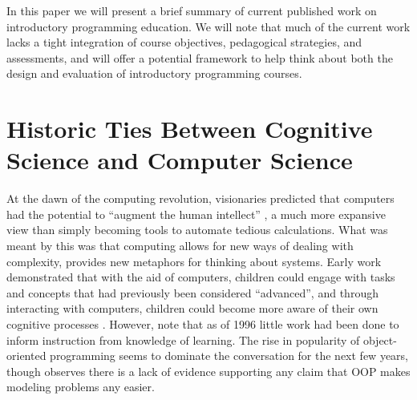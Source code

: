 \documentclass[12pt]{article}
\let\textcite=\autocite
\begin{document}
In this paper we will present a brief summary of current published
work on introductory programming education. We will note that much of
the current work lacks a tight integration of course objectives,
pedagogical strategies, and assessments, and will offer a potential
framework to help think about both the design and evaluation of
introductory programming courses.


\section{Historic Ties Between Cognitive Science and Computer Science}
At the dawn of the computing revolution, visionaries predicted that
computers had the potential to “augment the human intellect”
\autocite{engelbart_augmenting_1962}, a much more expansive view than
simply becoming tools to automate tedious calculations. What was meant
by this was that computing allows for new ways of dealing with
complexity, provides new metaphors for thinking about
systems\autocite{kay_history_1996}. Early work demonstrated that with
the aid of computers, children could engage with tasks and concepts
that had previously been considered “advanced”, and through
interacting with computers, children could become more aware of their
own cognitive processes \autocite{papert_mindstorms_1980}. However,
\textcite{east_patternbased_1996} note that as of 1996 little work had
been done to inform instruction from knowledge of learning. The rise
in popularity of object-oriented programming seems to dominate the
conversation for the next few years, though
\textcite{robins_learning_2003} observes there is a lack of evidence
supporting any claim that OOP makes modeling problems any easier.



\end{document}
